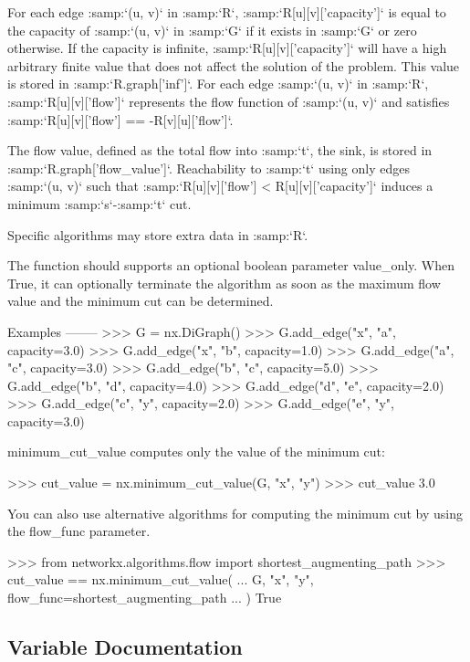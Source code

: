 \begin{DoxyVerb}
For each edge :samp:`(u, v)` in :samp:`R`, :samp:`R[u][v]['capacity']`
is equal to the capacity of :samp:`(u, v)` in :samp:`G` if it exists
in :samp:`G` or zero otherwise. If the capacity is infinite,
:samp:`R[u][v]['capacity']` will have a high arbitrary finite value
that does not affect the solution of the problem. This value is stored in
:samp:`R.graph['inf']`. For each edge :samp:`(u, v)` in :samp:`R`,
:samp:`R[u][v]['flow']` represents the flow function of :samp:`(u, v)` and
satisfies :samp:`R[u][v]['flow'] == -R[v][u]['flow']`.

The flow value, defined as the total flow into :samp:`t`, the sink, is
stored in :samp:`R.graph['flow_value']`. Reachability to :samp:`t` using
only edges :samp:`(u, v)` such that
:samp:`R[u][v]['flow'] < R[u][v]['capacity']` induces a minimum
:samp:`s`-:samp:`t` cut.

Specific algorithms may store extra data in :samp:`R`.

The function should supports an optional boolean parameter value_only. When
True, it can optionally terminate the algorithm as soon as the maximum flow
value and the minimum cut can be determined.

Examples
--------
>>> G = nx.DiGraph()
>>> G.add_edge("x", "a", capacity=3.0)
>>> G.add_edge("x", "b", capacity=1.0)
>>> G.add_edge("a", "c", capacity=3.0)
>>> G.add_edge("b", "c", capacity=5.0)
>>> G.add_edge("b", "d", capacity=4.0)
>>> G.add_edge("d", "e", capacity=2.0)
>>> G.add_edge("c", "y", capacity=2.0)
>>> G.add_edge("e", "y", capacity=3.0)

minimum_cut_value computes only the value of the
minimum cut:

>>> cut_value = nx.minimum_cut_value(G, "x", "y")
>>> cut_value
3.0

You can also use alternative algorithms for computing the
minimum cut by using the flow_func parameter.

>>> from networkx.algorithms.flow import shortest_augmenting_path
>>> cut_value == nx.minimum_cut_value(
...     G, "x", "y", flow_func=shortest_augmenting_path
... )
True\end{DoxyVerb}
 

\subsection{Variable Documentation}
\mbox{\label{namespacenetworkx_1_1algorithms_1_1flow_1_1maxflow_a857a2f8be172db71de98b250db0394fa}} 
